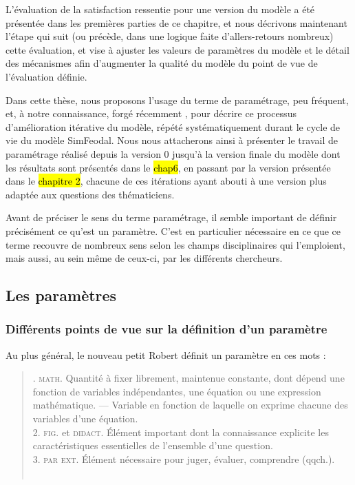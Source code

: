 L'évaluation de la \og satisfaction\fg{} ressentie pour une version du modèle a été présentée dans les premières parties de ce chapitre, et nous décrivons maintenant l'étape qui suit (ou précède, dans une logique faite d'allers-retours nombreux) cette évaluation, et vise à ajuster les valeurs de paramètres du modèle et le détail des mécanismes afin d'augmenter la qualité du modèle du point de vue de l'évaluation définie.

Dans cette thèse, nous proposons l'usage du terme de \og paramétrage\fg{}, peu fréquent, et, à notre connaissance, forgé récemment \autocite{hirtzel2015exploration,tannier_analyse_2017}, pour décrire ce processus d'\og amélioration\fg{} itérative du modèle, répété systématiquement durant le cycle de vie du modèle SimFeodal.
Nous nous attacherons ainsi à présenter le travail de paramétrage réalisé depuis la version 0 jusqu'à la version \og finale\fg{} du modèle dont les résultats sont présentés dans le \hl{chap6}, en passant par la version présentée dans le \hl{chapitre 2}, chacune de ces itérations ayant abouti à une version plus adaptée aux questions des thématiciens.

Avant de préciser le sens du terme \og paramétrage\fg{}, il semble important de définir précisément ce qu'est un paramètre.
C'est en particulier nécessaire en ce que ce terme recouvre de nombreux sens selon les champs disciplinaires qui l'emploient, mais aussi, au sein même de ceux-ci, par les différents chercheurs.

\subsection{Les paramètres}

\subsubsection{Différents points de vue sur la définition d'un paramètre}

Au plus général, le nouveau petit Robert définit un paramètre en ces mots :
\begin{quotation}
	\noindent {}. \textsc{math.} Quantité à fixer librement, maintenue constante, dont dépend une fonction de variables indépendantes, une équation ou une expression mathématique. --- Variable en fonction de laquelle on exprime chacune des variables d'une équation.\\
	2. \textsc{fig.} et \textsc{didact.} Élément important dont la connaissance explicite les caractéristiques essentielles de l'ensemble d'une question.\\
	3. \textsc{par ext.} Élément nécessaire pour juger, évaluer, comprendre (qqch.).\fg{}\\
	\mbox{}~ \hfill \autocite[\textbf{Paramètre}]{robert_nouveau_1993}
\end{quotation}


